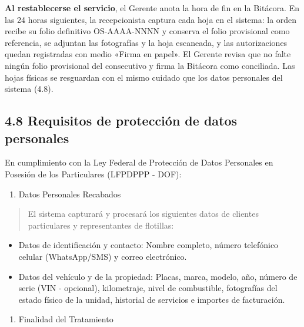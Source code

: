 \textbf{Al restablecerse el servicio}, el Gerente anota la hora de fin en
la Bitácora. En las 24 horas siguientes, la recepcionista captura cada hoja
en el sistema: la orden recibe su folio definitivo OS-AAAA-NNNN y conserva
el folio provisional como referencia, se adjuntan las fotografías y la hoja
escaneada, y las autorizaciones quedan registradas con medio «Firma en
papel». El Gerente revisa que no falte ningún folio provisional del
consecutivo y firma la Bitácora como conciliada. Las hojas físicas se
resguardan con el mismo cuidado que los datos personales del sistema (4.8).


\subsection{4.8 Requisitos de protección de datos
personales}\label{requisitos-de-protecciuxf3n-de-datos-personales}

En cumplimiento con la Ley Federal de Protección de Datos Personales en
Posesión de los Particulares (LFPDPPP - DOF):

\begin{enumerate}
\def\labelenumi{\arabic{enumi}.}
\item
  Datos Personales Recabados
\end{enumerate}

\begin{quote}
El sistema capturará y procesará los siguientes datos de clientes
particulares y representantes de flotillas:
\end{quote}

\begin{itemize}
\item
  Datos de identificación y contacto: Nombre completo, número telefónico
  celular (WhatsApp/SMS) y correo electrónico.
\item
  Datos del vehículo y de la propiedad: Placas, marca, modelo, año,
  número de serie (VIN - opcional), kilometraje, nivel de combustible,
  fotografías del estado físico de la unidad, historial de servicios e
  importes de facturación.
\end{itemize}

\begin{enumerate}
\def\labelenumi{\arabic{enumi}.}
\setcounter{enumi}{1}
\item
  Finalidad del Tratamiento
\end{enumerate}


